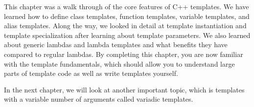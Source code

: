 This chapter was a walk through of the core features of C++ templates. We have learned how to define class templates, function templates, variable templates, and alias templates. Along the way, we looked in detail at template instantiation and template specialization after learning about template parameters. We also learned about generic lambdas and lambda templates and what benefits they have compared to regular lambdas. By completing this chapter, you are now familiar with the template fundamentals, which should allow you to understand large parts of template code as well as write templates yourself.

In the next chapter, we will look at another important topic, which is templates with a variable number of arguments called variadic templates.